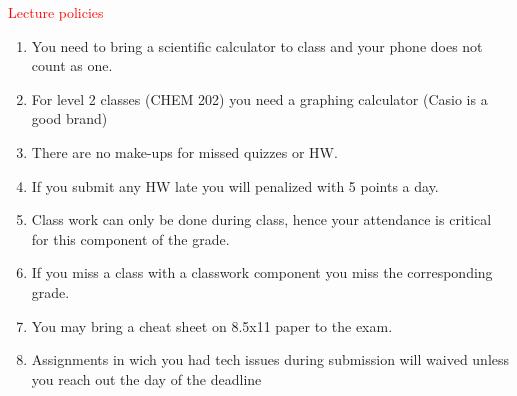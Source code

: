 \documentclass[cover.tex]{subfiles}
\begin{document}
 


\begin{mdframed}[style=MyFrame]
\begin{center}{\textcolor{red}{\Large Lecture policies}}\end{center}
\begin{enumerate}
\item You need to bring a scientific calculator to class and your phone does not count as one.
\item For level 2 classes (CHEM 202) you need a graphing calculator (Casio is a good brand)
\item There are no make-ups for missed quizzes or HW.  
\item If you submit any HW late you will penalized with 5 points a day.
\item Class work can only be done during class, hence your attendance is critical for this component of the grade.
\item If you miss a class with a classwork component you miss the corresponding grade.
\item You may bring a cheat sheet on 8.5x11 paper to the exam.
\item Assignments in wich you had tech issues during submission will waived unless you reach out the day of the deadline
\end{enumerate}

 
    \par\noindent\makebox[1.5in]{\hrulefill}   \hfill\makebox[2.0in]{\hrulefill}    \hfill\makebox[2.0in]{\hrulefill}  \par\noindent{}    \hfill{}   \hfill{} 
 

\end{mdframed}
\end{document}
